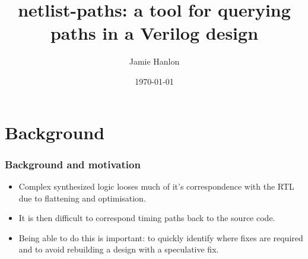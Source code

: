 \documentclass[professionalfonts]{beamer}
\begin{document}
\title{netlist-paths: a tool for querying paths in a Verilog design}
\author{Jamie Hanlon}
\date{\today}
\frame{\titlepage}


\section{Background}
\begin{frame}
\frametitle{Background and motivation}
  \begin{itemize}
  \item Complex synthesized logic looses much of it's correspondence with the
    RTL due to flattening and optimisation.
  \item It is then difficult to correspond timing paths back to the source code.
  \item Being able to do this is important: to quickly identify where fixes are
    required and to avoid rebuilding a design with a speculative fix.
  \end{itemize}
\end{frame}
\end{document}
